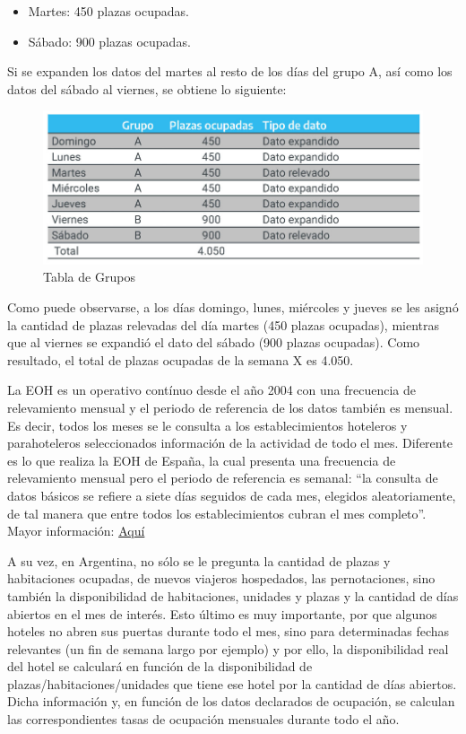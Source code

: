 \documentclass[
]{book}
\begin{document}
\begin{itemize}
\item
  Martes: 450 plazas ocupadas.
\item
  Sábado: 900 plazas ocupadas.
\end{itemize}

Si se expanden los datos del martes al resto de los días del grupo A, así como los datos del sábado al viernes, se obtiene lo siguiente:

\begin{figure}

{\centering \includegraphics[width=0.8\linewidth]{imagenes/tabla_5a} 

}

\caption{Tabla de Grupos}\label{fig:grupo-a-b}
\end{figure}

Como puede observarse, a los días domingo, lunes, miércoles y jueves se les asignó la cantidad de plazas relevadas del día martes (450 plazas ocupadas), mientras que al viernes se expandió el dato del sábado (900 plazas ocupadas). Como resultado, el total de plazas ocupadas de la semana X es 4.050.

La EOH es un operativo contínuo desde el año 2004 con una frecuencia de relevamiento mensual y el periodo de referencia de los datos también es mensual. Es decir, todos los meses se le consulta a los establecimientos hoteleros y parahoteleros seleccionados información de la actividad de todo el mes. Diferente es lo que realiza la EOH de España, la cual presenta una frecuencia de relevamiento mensual pero el periodo de referencia es semanal: ``la consulta de datos básicos se refiere a siete días seguidos de cada mes, elegidos aleatoriamente, de tal manera que entre todos los establecimientos cubran el mes completo''. Mayor información: \href{https://www.ine.es/daco/daco42/ocuphotel/notaeoh.htm}{Aquí}

A su vez, en Argentina, no sólo se le pregunta la cantidad de plazas y habitaciones ocupadas, de nuevos viajeros hospedados, las pernotaciones, sino también la disponibilidad de habitaciones, unidades y plazas y la cantidad de días abiertos en el mes de interés. Esto último es muy importante, por que algunos hoteles no abren sus puertas durante todo el mes, sino para determinadas fechas relevantes (un fin de semana largo por ejemplo) y por ello, la disponibilidad real del hotel se calculará en función de la disponibilidad de plazas/habitaciones/unidades que tiene ese hotel por la cantidad de días abiertos. Dicha información y, en función de los datos declarados de ocupación, se calculan las correspondientes tasas de ocupación mensuales durante todo el año.
\end{document}
